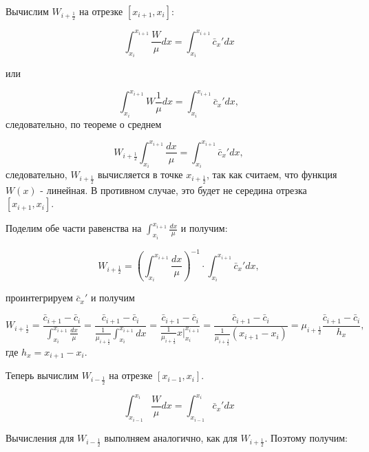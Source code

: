 \documentclass[12pt]{article}
\begin{document}
	Вычислим $W_{i+\frac{1}{2}}$ на отрезке $[x_{i+1},x_i]$:
	
\begin{equation*}
	\int_{x_i}^{x_{i+1}}\frac{W}{\mu}dx = \int_{x_i}^{x_{i+1}}\bar{c}_x'dx
\end{equation*}

или

\begin{equation*}
	\int_{x_i}^{x_{i+1}}W\frac{1}{\mu}dx = \int_{x_i}^{x_{i+1}}\bar{c}_x'dx,
\end{equation*}
следовательно, по теореме о среднем

\begin{equation*}
	W_{i+\frac{1}{2}}\int_{x_i}^{x_{i+1}}\frac{dx}{\mu}=\int_{x_i}^{x_{i+1}}\bar{c}_x'dx,
\end{equation*}
следовательно, $W_{i+\frac{1}{2}}$ вычисляется в точке $x_{i+\frac{1}{2}}$, так как считаем, что функция $W(x)$ - линейная. 
В противном случае, это будет не середина отрезка  $[x_{i+1},x_i]$.
 
Поделим обе части равенства на $\int_{x_i}^{x_{i+1}}\frac{dx}{\mu}$ и получим:

\begin{equation*}
	W_{i+\frac{1}{2}}=\left(\int_{x_i}^{x_{i+1}}\frac{dx}{\mu}\right)^{-1}\cdot\int_{x_i}^{x_{i+1}}\bar{c}_x'dx,
\end{equation*}

проинтегрируем $\bar{c}_x'$ и получим 

\begin{equation*}
	W_{i+\frac{1}{2}}=\frac{\bar{c}_{i+1} - \bar{c}_{i}}{\int_{x_i}^{x_{i+1}}\frac{dx}{\mu}}=\frac{\bar{c}_{i+1} - \bar{c}_{i}}{\frac{1}{\mu_{i+\frac{1}{2}}}\int_{x_i}^{x_{i+1}}dx} = \frac{\bar{c}_{i+1}-\bar{c}_{i}} {\frac{1}{\mu_{i+\frac{1}{2}}}x\bigg|_{x_{i}}^{x_{i+1}}} = \frac{\bar{c}_{i+1} - \bar{c}_{i}} {\frac{1}{\mu_{i+\frac{1}{2}}} (x_{i+1} - x_i)} =\mu_{i+\frac{1}{2}} \frac{\bar{c}_{i+1} - \bar{c}_{i}} {h_{x}},
\end{equation*}
где $h_{x}=x_{i+1}- x_i$.

Теперь вычислим $W_{i-\frac{1}{2}}$  на отрезке $[x_{i-1}, x_i]$.

\begin{equation*}
\int_{x_{i-1}}^{x_{i}}\frac{W}{\mu}dx = \int_{x_{i-1}}^{x_{i}}\bar{c}_x'dx
\end{equation*}

Вычисления для $W_{i-\frac{1}{2}}$ выполняем аналогично, как для $W_{i+\frac{1}{2}}$. Поэтому получим:
\end{document}
